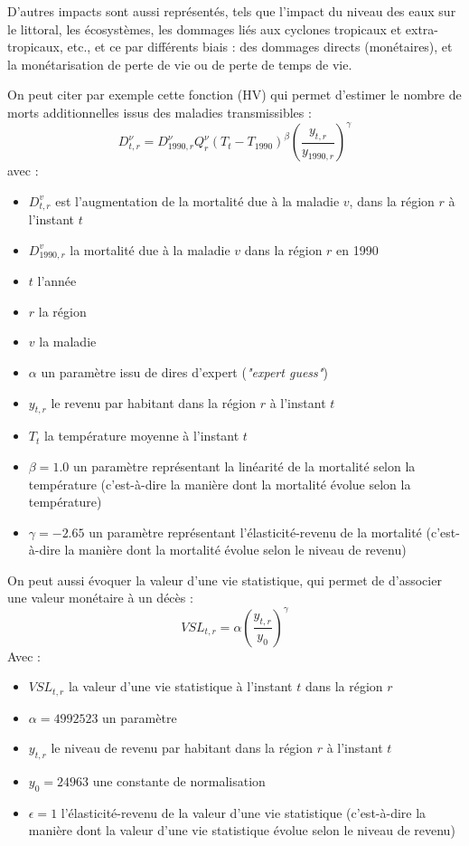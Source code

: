 D'autres impacts sont aussi représentés, tels que l'impact du niveau des eaux sur le littoral, les écosystèmes, les dommages liés aux cyclones tropicaux et extra-tropicaux, etc., et ce par différents biais : des dommages directs (monétaires), et la monétarisation de perte de vie ou de perte de temps de vie. 

On peut citer par exemple cette fonction (HV) qui permet d'estimer le nombre de morts additionnelles issus des maladies transmissibles  :  
\begin{equation}
    D_{t,r}^{\nu}=D_{1990,r}^{\nu}Q_{r}^{\nu}\left(T_{t}-T_{1990}\right)^{\beta}\left(\frac{y_{t,r}}{y_{1990,r}}\right)^{\gamma}
    \label{eq:fund_HV}
\end{equation}
avec : 
\begin{itemize}
    \item $D^v_{t,r}$ est l'augmentation de la mortalité due à la maladie $v$, dans la région $r$ à l'instant $t$ 
    \item $D^v_{1990,r}$ la mortalité due à la maladie $v$ dans la région $r$ en 1990
    \item $t$ l'année
    \item $r$ la région
    \item $v$ la maladie
    \item $\alpha$ un paramètre issu de dires d'expert (\emph{"expert guess"})
    \item $y_{t,r}$ le revenu par habitant dans la région $r$ à l'instant $t$ 
    \item $T_t$ la température moyenne à l'instant $t$
    \item $\beta = 1.0$ un paramètre représentant la linéarité de la mortalité selon la température (c'est-à-dire la manière dont la mortalité évolue selon la température)
    \item $\gamma = -2.65$ un paramètre représentant l'élasticité-revenu de la mortalité (c'est-à-dire la manière dont la mortalité évolue selon le niveau de revenu)  
\end{itemize}

On peut aussi évoquer la valeur d'une vie statistique, qui permet de d'associer une valeur monétaire à un décès : 
\begin{equation}
    V S L_{t,r}=\alpha\left(\frac{y_{t,r}}{y_{0}}\right)^{\gamma}
    \label{eq:VSL}
\end{equation}
Avec : 
\begin{itemize}
    \item $VSL_{t,r}$ la valeur d'une vie statistique à l'instant $t$ dans la région $r$
    \item $\alpha = 4992523$ un paramètre
    \item $y_{t,r}$ le niveau de revenu par habitant dans la région $r$ à l'instant $t$ 
    \item $y_0 = 24963$ une constante de normalisation
    \item $\epsilon = 1$ l'élasticité-revenu de la valeur d'une vie statistique (c'est-à-dire la manière dont la valeur d'une vie statistique évolue selon le niveau de revenu)
\end{itemize}

